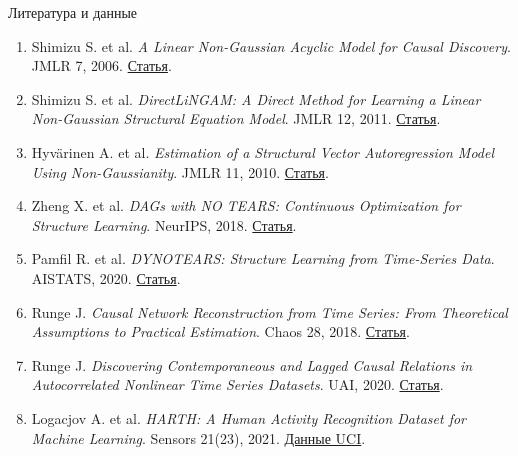 \documentclass[aspectratio=169]{beamer}
\begin{document}
\begin{frame}{Литература и данные}
    \fontsize{8.5}{10}\selectfont
    \begin{enumerate}
        \item Shimizu S. et al. \textit{A Linear Non-Gaussian Acyclic Model for Causal Discovery}. JMLR 7, 2006. \href{https://jmlr.org/papers/v7/shimizu06a.html}{Статья}.
        \item Shimizu S. et al. \textit{DirectLiNGAM: A Direct Method for Learning a Linear Non-Gaussian Structural Equation Model}. JMLR 12, 2011. \href{https://jmlr.org/papers/v12/shimizu11a.html}{Статья}.
        \item Hyvärinen A. et al. \textit{Estimation of a Structural Vector Autoregression Model Using Non-Gaussianity}. JMLR 11, 2010. \href{https://jmlr.org/papers/v11/hyvarinen10a.html}{Статья}.
        \item Zheng X. et al. \textit{DAGs with NO TEARS: Continuous Optimization for Structure Learning}. NeurIPS, 2018. \href{https://arxiv.org/abs/1803.01422}{Статья}.
        \item Pamfil R. et al. \textit{DYNOTEARS: Structure Learning from Time-Series Data}. AISTATS, 2020. \href{https://proceedings.mlr.press/v108/pamfil20a.html}{Статья}.
        \item Runge J. \textit{Causal Network Reconstruction from Time Series: From Theoretical Assumptions to Practical Estimation}. Chaos 28, 2018. \href{https://doi.org/10.1063/1.5025050}{Статья}.
        \item Runge J. \textit{Discovering Contemporaneous and Lagged Causal Relations in Autocorrelated Nonlinear Time Series Datasets}. UAI, 2020. \href{https://proceedings.mlr.press/v124/runge20a.html}{Статья}.
        \item Logacjov A. et al. \textit{HARTH: A Human Activity Recognition Dataset for Machine Learning}. Sensors 21(23), 2021. \href{https://archive.ics.uci.edu/dataset/779/harth}{Данные UCI}.
    \end{enumerate}
\end{frame}

\appendix
\end{document}
